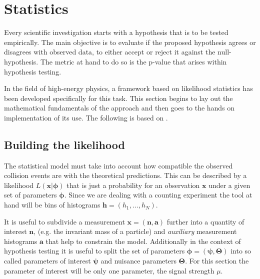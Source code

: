 \section{Statistics}\label{sec:statistics}

Every scientific investigation starts with a hypothesis that is to be tested empirically. The main objective is to evaluate if the proposed hypothesis agrees or disagrees with observed data, to either accept or reject it against the null-hypothesis. The metric at hand to do so is the p-value that arises within hypothesis testing. 

In the field of high-energy physics, a framework based on likelihood statistics has been developed specifically for this task. This section begins to lay out the mathematical fundamentals of the approach and then goes to the hands on implementation of its use. The following is based on \citep{cowan2011asymptotic,behnke2013data,pyhf_intro}.

\subsection{Building the likelihood}
The statistical model must take into account how compatible the observed collision events are with the theoretical predictions. This can be described by a likelihood $L(\bm{x} | \bm{\phi})$ that is just a probability for an observation $\bm{x}$ under a given set of parameters $\bm{\phi}$. Since we are dealing with a counting experiment the tool at hand will be bins of histograms $\bm{h}=(h_1,...,h_N)$. 

It is useful to subdivide a measurement $\bm{x}=(\bm{n},\bm{a})$ further into a quantity of interest $\bm{n}$, (e.g. the invariant mass of a particle) and \textit{auxiliary} measurement histograms $\bm{a}$ that help to constrain the model. Additionally in the context of hypothesis testing it is useful to split the set of parameters $\bm{\phi}=(\bm{\psi},\bm{\Theta})$ into so called parameters of interest $\bm{\psi}$ and nuisance parameters $\bm{\Theta}$. For this section the parameter of interest will be only one parameter, the signal strength $\mu$. 

